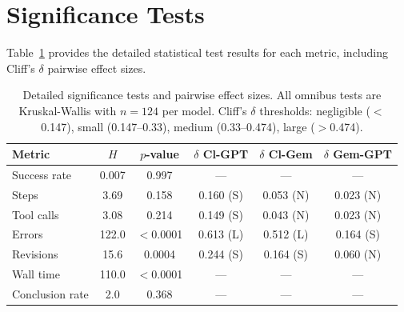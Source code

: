 \documentclass{article}
\begin{document}
\section{Significance Tests}
\label{app:significance}

Table~\ref{tab:significance} provides the detailed statistical test results for each metric, including Cliff's $\delta$ pairwise effect sizes.

\begin{table}[h]
\caption{Detailed significance tests and pairwise effect sizes. All omnibus tests are Kruskal-Wallis with $n=124$ per model. Cliff's $\delta$ thresholds: negligible ($<$0.147), small (0.147--0.33), medium (0.33--0.474), large ($>$0.474).}
\label{tab:significance}
\centering
\small
\begin{tabular}{lccccc}
\toprule
\textbf{Metric} & \textbf{$H$} & \textbf{$p$-value} & \textbf{$\delta$ Cl-GPT} & \textbf{$\delta$ Cl-Gem} & \textbf{$\delta$ Gem-GPT} \\
\midrule
Success rate & 0.007 & 0.997 & --- & --- & --- \\
Steps & 3.69 & 0.158 & 0.160 (S) & 0.053 (N) & 0.023 (N) \\
Tool calls & 3.08 & 0.214 & 0.149 (S) & 0.043 (N) & 0.023 (N) \\
Errors & 122.0 & $<$0.0001 & 0.613 (L) & 0.512 (L) & 0.164 (S) \\
Revisions & 15.6 & 0.0004 & 0.244 (S) & 0.164 (S) & 0.060 (N) \\
Wall time & 110.0 & $<$0.0001 & --- & --- & --- \\
Conclusion rate & 2.0 & 0.368 & --- & --- & --- \\
\bottomrule
\end{tabular}
\end{table}
\end{document}
